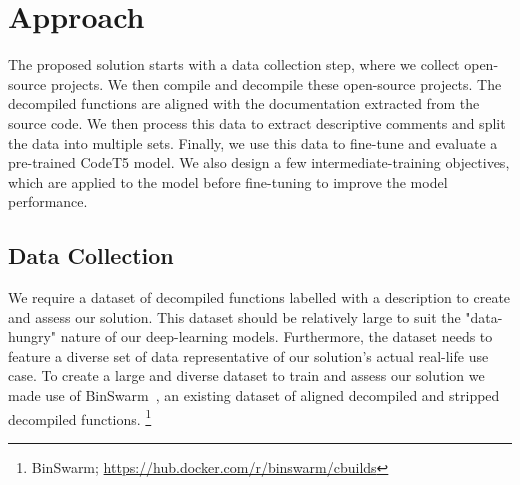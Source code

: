 \chapter{Approach}
\label{methodology}

The proposed solution starts with a data collection step, where we collect open-source projects. We then compile and decompile these open-source projects. The decompiled functions are aligned with the documentation extracted from the source code. We then process this data to extract descriptive comments and split the data into multiple sets. Finally, we use this data to fine-tune and evaluate a pre-trained CodeT5 model. We also design a few intermediate-training objectives, which are applied to the model before fine-tuning to improve the model performance. 


\section{Data Collection}
We require a dataset of decompiled functions labelled with a description to create and assess our solution. This dataset should be relatively large to suit the "data-hungry" nature of our deep-learning models. Furthermore, the dataset needs to feature a diverse set of data representative of our solution's actual real-life use case. 
To create a large and diverse dataset to train and assess our solution we made use of BinSwarm~\cite{FUNCRE}, an existing dataset of aligned decompiled and stripped decompiled functions. \footnote{BinSwarm; \url{https://hub.docker.com/r/binswarm/cbuilds}}

